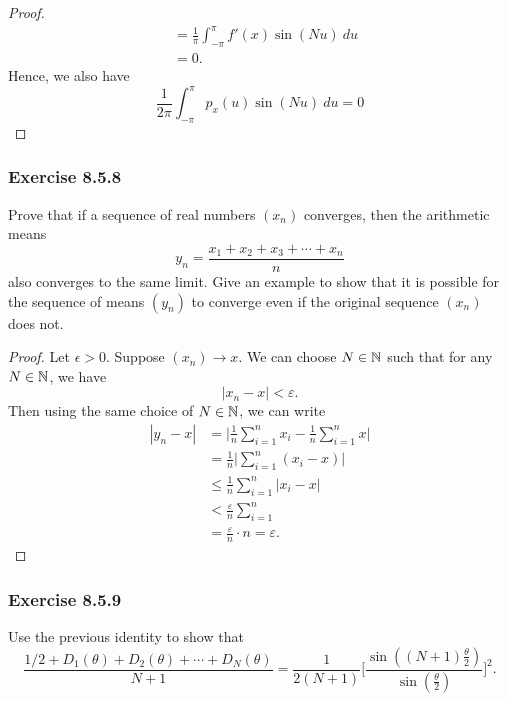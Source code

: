 \begin{enumerate}
\begin{proof}
\begin{align*}
                                                                                                                   &= \frac{ 1  }{ \pi  } \int_{ -\pi  }^{ \pi  } f'(x) \sin(Nu) \ du \\
                                                                                                                   &= 0.
        \end{align*}
        Hence, we also have 
        \[  \frac{ 1 }{ 2 \pi  } \int_{ -\pi  }^{ \pi  } p_{x}(u) \sin(Nu) \ du = 0 \]
        \end{proof}
\end{enumerate} 

\subsubsection{Exercise 8.5.8} Prove that if a sequence of real numbers \( (x_{n})  \) converges, then the arithmetic means 
\[  y_{n} = \frac{ x_{1} + x_{2} + x_{3 } + \dotsb + x_{n}  }{ n } \]
also converges to the same limit. Give an example to show that it is possible for the sequence of means \( (y_{n}) \) to converge even if the original sequence \( (x_{n}) \) does not.
\begin{proof}
    Let \( \epsilon > 0  \). Suppose \( (x_{n}) \to x  \). We can choose \( N \in \mathbb{N}  \) such that for any \( N \in \mathbb{N}  \), we have 
    \[  | x_{n} - x  | < \varepsilon.  \]
Then using the same choice of \( N \in \mathbb{N}  \), we can write 
\begin{align*}
    | y_{n} - x  | &= \Big| \frac{ 1 }{ n } \sum_{ i=1  }^{ n } x_{i} - \frac{ 1 }{ n }  \sum_{ i=1  }^{ n } x  \Big|  \\
                   &= \frac{ 1 }{ n }  \Big| \sum_{ i=1  }^{ n  } (x_{i } - x ) \Big| \\
                   &\leq \frac{ 1 }{ n }  \sum_{ i=1  }^{ n } | x_{i} -x  | \\
                   &< \frac{ \varepsilon }{ n } \sum_{ i=1 }^{ n } \\ 
                   &= \frac{ \varepsilon }{ n } \cdot n = \varepsilon.
\end{align*}
\end{proof}

\subsubsection{Exercise 8.5.9} Use the previous identity to show that
\[  \frac{ 1 /2 + D_{1}(\theta) + D_{2}(\theta) + \dotsb  + D_{N}(\theta) }{ N+1  } = \frac{ 1 }{ 2 (N+1)  } \Bigg[\frac{ \sin((N+1) \frac{ \theta }{ 2 } ) }{ \sin( \frac{ \theta  }{ 2 } ) } \Bigg]^{2}.  \]

